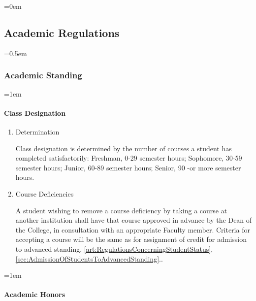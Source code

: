 \documentclass{manual}
\newcommand{\oldbreak}[1]{}
\let\oldsubsection\subsection
\renewcommand\subsection{\leftskip=0em\oldsubsection}
\let\oldsubsubsection\subsubsection
\renewcommand\subsubsection{\leftskip=0.5em\oldsubsubsection}
\let\oldparagraph\paragraph
\renewcommand\paragraph{\leftskip=1em\oldparagraph}
\newcommand{\itemLevelA}{\alph*.}
\newcommand{\itemRefA}{\alph*}
\begin{document}
\oldbreak{VI-2}

\subsection{Academic Regulations}\label{sec:AcademicRegulations}
\subsubsection{Academic Standing}\label{sub:AcademicStanding}

\paragraph{Class Designation }

\begin{enumerate}[label=\itemLevelA,ref=\itemRefA]
\item Determination

Class designation is determined by the number of courses a student has completed satisfactorily: Freshman, 0-29 semester hours; Sophomore, 30-59 semester hours; Junior, 60-89 semester hours; Senior, 90 -or more semester hours.

\item Course Deficiencies



A student wishing to remove a course deficiency by taking a course at another institution shall have that course approved in advance by the Dean of the College, in consultation with an appropriate Faculty member. Criteria for accepting a course will be the same as for assignment of credit for admission to advanced standing, \cref{art:RegulationsConcerningStudentStatus}, \cref{sec:AdmissionOfStudentsToAdvancedStanding}..
\end{enumerate}
\paragraph{Academic Honors}
\end{document}
